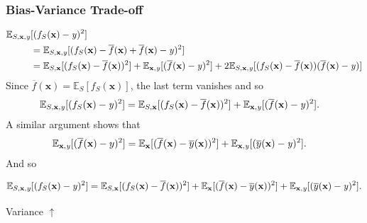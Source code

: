 \documentclass[smaller]{beamer}
\theoremstyle{example}
\newcommand{\x}{\textbf{x}}
\newcommand{\ix}[1]{{\it #1}}
\begin{document}
\begin{frame}
    \frametitle{Bias-Variance Trade-off}
    \begin{align*}
        \mathbb E_{S,\x, \ix y}&[(f_S(\x) - \ix y)^2] \\
            &= \mathbb E_{S,\x, \ix y}[(f_S(\x) - \overline{f}(\x) + \overline{f}(\x) - \ix y)^2] \\
            &= \mathbb E_{S,\x}[(f_S(\x) - \overline{f}(\x))^2] + \mathbb E_{\x,\ix y}[(\overline{f}(\x) - \ix y)^2] + 2\mathbb E_{S,\x,\ix y}[(f_S(\x)-\overline{f}(\x))(\overline{f}(\x) - \ix y)]
    \end{align*}
    Since $\overline{f}(\x) = \mathbb E_S[f_S(\x)]$, the last term vanishes and so
    \begin{align*}
        \mathbb E_{S,\x, \ix y}[(f_S(\x) - \ix y)^2] 
        &= \mathbb E_{S,\x}[(f_S(\x) - \overline{f}(\x))^2] + \mathbb E_{\x,\ix y}[(\overline{f}(\x) - \ix y)^2].
    \end{align*}
    A similar argument shows that 
    \begin{align*}
        \mathbb E_{\x, \ix y}[(\overline{f}(\x) - y)^2] 
        &= \mathbb E_{\x}[(\overline{f}(\x) - \overline{y}(\x))^2] + \mathbb E_{\x,\ix y}[(\overline{y}(\x) - \ix y)^2].
    \end{align*}
    And so 
    {\small
    \[\mathbb E_{S,\x, \ix y}[(f_S(\x) - \ix y)^2]  
     = \mathbb E_{S,\x}[(f_S(\x) - \overline{f}(\x))^2] + \mathbb E_{\x}[(\overline{f}(\x) - \overline{y}(\x))^2] + \mathbb E_{\x,\ix y}[(\overline{y}(\x) - \ix y)^2].\]
     \begin{flushright}{\color{blue}Variance $\uparrow$}\qquad\qquad\qquad{}\qquad\qquad{}\qquad\quad\phantom{i} \end{flushright}
    }
\end{frame}
\end{document}
